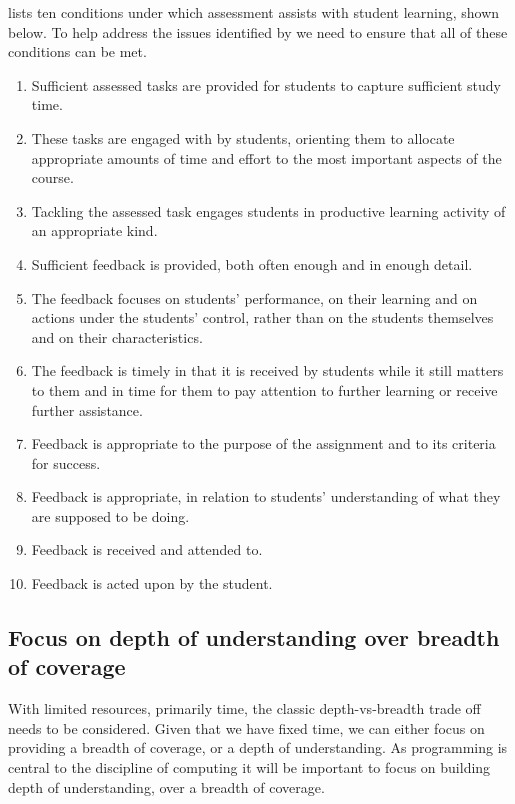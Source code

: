 \citet{Gibbs:2004} lists ten conditions under which assessment assists with student learning, shown below. To help address the issues identified by \citet{Smith:2005} we need to ensure that all of these conditions can be met.
\begin{enumerate}
	\item Sufficient assessed tasks are provided for students to capture sufficient study time.
	\item These tasks are engaged with by students, orienting them to allocate appropriate amounts of time and effort to the most important aspects of the course.
	\item Tackling the assessed task engages students in productive learning activity of an appropriate kind.
	\item Sufficient feedback is provided, both often enough and in enough detail.
	\item The feedback focuses on students' performance, on their learning and on actions under the students' control, rather than on the students themselves and on their characteristics.
	\item The feedback is timely in that it is received by students while it still matters to them and in time for them to pay attention to further learning or receive further assistance.
	\item Feedback is appropriate to the purpose of the assignment and to its criteria for success.
	\item Feedback is appropriate, in relation to students' understanding of what they are supposed to be doing.
	\item Feedback is received and attended to.
	\item Feedback is acted upon by the student.
\end{enumerate}


\subsection{Focus on depth of understanding over breadth of coverage} %
\label{ssub:focus_on_depth_of_understanding_over_breadth_of_coverage_}

With limited resources, primarily time, the classic depth-vs-breadth trade off needs to be considered. Given that we have fixed time, we can either focus on providing a breadth of coverage, or a depth of understanding. As programming is central to the discipline of computing \cite{McGettrick:2005} it will be important to focus on building depth of understanding, over a breadth of coverage.

